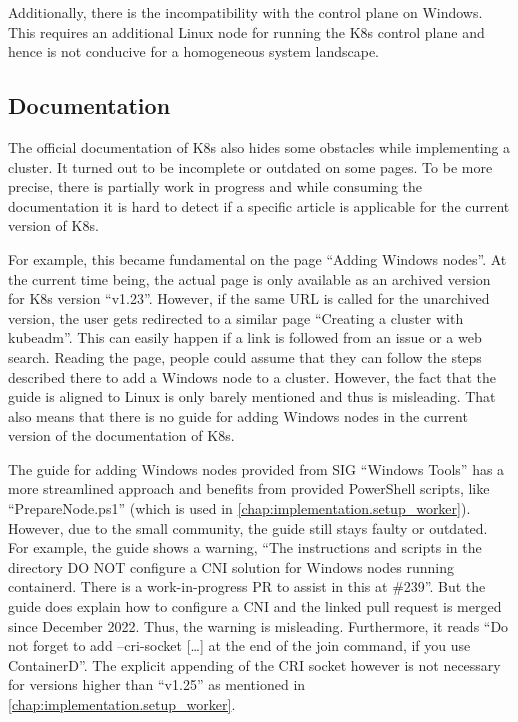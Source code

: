 Additionally, there is the incompatibility with the control plane on \ac{Windows}. This requires an additional Linux node for running the \ac{K8s} control plane and hence is not conducive for a homogeneous system landscape. 

\subsection{Documentation}
The official documentation of \ac{K8s} also hides some obstacles while implementing a cluster. It turned out to be incomplete or outdated on some pages.
To be more precise, there is partially work in progress and while consuming the documentation it is hard to detect if a specific article is applicable for the current version of \ac{K8s}.

For example, this became fundamental on the page \enquote{Adding Windows nodes}\cite{Kubernetes.20220419}. At the current time being, the actual page is only available as an archived version for \ac{K8s} version \enquote{v1.23}. However, if the same \ac{URL} is called for the unarchived version, the user gets redirected to a similar page \enquote{Creating a cluster with kubeadm}\cite{Kubernetes.20221107}. This can easily happen if a link is followed from an issue or a web search. Reading the page, people could assume that they can follow the steps described there to add a \ac{Windows} node to a cluster. However, the fact that the guide is aligned to Linux is only barely mentioned and thus is misleading.
That also means that there is no guide for adding \ac{Windows} nodes in the current version of the documentation of \ac{K8s}.

The guide for adding \ac{Windows} nodes provided from \ac{SIG} \enquote{Windows Tools}\cite{GitHubKubernetesSIGWindowsTools.20230213} has a more streamlined approach and benefits from provided PowerShell scripts, like \enquote{PrepareNode.ps1} (which is used in \autoref{chap:implementation.setup_worker}). However, due to the small community, the guide still stays faulty or outdated. For example, the guide shows a warning, \enquote{The instructions and scripts in the directory DO NOT configure a CNI solution for Windows nodes running containerd. There is a work-in-progress PR to assist in this at \#239}\cite{GitHubKubernetesSIGWindowsTools.20230213}. But the guide does explain how to configure a \ac{CNI} and the linked pull request is merged since December 2022. Thus, the warning is misleading.
Furthermore, it reads \enquote{Do not forget to add --cri-socket [\dots] at the end of the join command, if you use ContainerD}\cite{GitHubKubernetesSIGWindowsTools.20230213}. The explicit appending of the \ac{CRI} socket however is not necessary for versions higher than \enquote{v1.25} as mentioned in \autoref{chap:implementation.setup_worker}.

